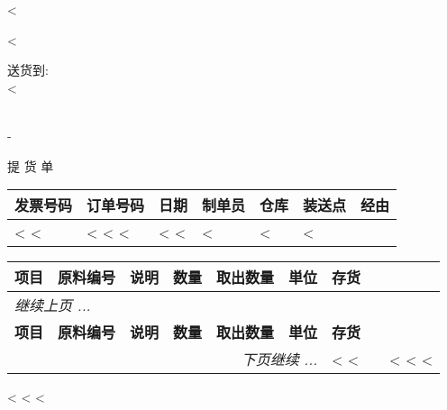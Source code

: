 <%


\begin{CJK}{UTF8}{arialuni}

\vspace*{-3.3cm}
<%
\vspace*{1.5cm}

\hspace{.55\textwidth}

\parbox[t]{.55\textwidth}{
送货到: \\
<%
}

\hfill \\
-
\vspace{1.0cm}

\centerline{提 货 单}
\hfill

\vspace{1cm}

\begin{tabularx}{\textwidth}{*{7}{|X}|} \hline
  \textbf{发票号码} & \textbf{订单号码} & \textbf{日期} & \textbf{制单员}
  & \textbf{仓库} & \textbf{装送点} & \textbf{经由} \\ [0.5em]
  \hline
  <%
  <%
  & <%
  <%
  <%
  & <%
  <%
  & <%
  & <%
  & <%
  \hline
\end{tabularx}

\vspace{1cm}

\begin{longtable}{|ll p{5.5cm} @{\extracolsep\fill} rrcl|} \hline
\xstrut
  \textbf{项目} & \textbf{原料编号} & \textbf{说明} & 
	\textbf{数量} & \textbf{取出数量} & \textbf{単位} & \textbf{存货} \\ [0.5em]     
  \hline
\endfirsthead
  \multicolumn{6}{l}{\emph{继续上页 ...}} \\
  \hline
  \textbf{项目} & \textbf{原料编号} & \textbf{说明} & 
	\textbf{数量} & \textbf{取出数量} & \textbf{単位} & \textbf{存货} \\ [0.5em]     
  \hline
\endhead
   \hline \multicolumn{6}{r}{\emph{下页继续 ...}}
\endfoot
   \hline 
\endlastfoot
<%
  <%
  [\hspace{1cm}] & <%
  <%
		& & <%
	<%
<%
\end{longtable}

\vspace{1.5cm}

\parbox{\textwidth}{
\vspace{0.5cm}
<%
  <%
<%
}

\vfill

\end{CJK}
